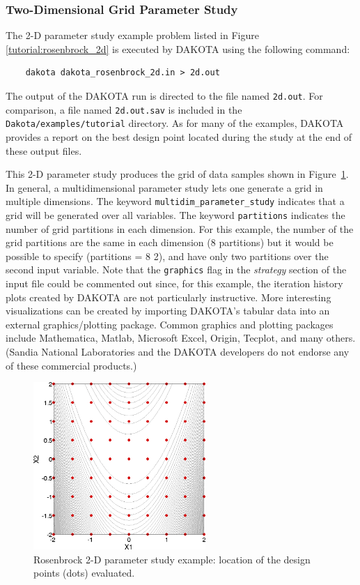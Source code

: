 \subsubsection{Two-Dimensional Grid Parameter Study}\label{tutorial:example:param_study:two}

The 2-D parameter study example problem listed in Figure~
\ref{tutorial:rosenbrock_2d} is executed by DAKOTA using the
following command:
\begin{small}
\begin{verbatim}
    dakota dakota_rosenbrock_2d.in > 2d.out
\end{verbatim}
\end{small}

The output of the DAKOTA run is directed to the file named
\texttt{2d.out}. For comparison, a file named \texttt{2d.out.sav} is
included in the \texttt{Dakota/examples/tutorial} directory. As
for many of the examples, DAKOTA provides a report on the best design
point located during the study at the end of these output files.

This 2-D parameter study produces the grid of data samples shown in
Figure~\ref{tutorial:rosenbrock_2d_graphics}. In general, a multidimensional 
parameter study lets one generate a grid in multiple dimensions. 
The keyword \texttt{multidim\_parameter\_study} indicates that 
a grid will be generated over all variables.  The keyword 
\texttt{partitions} indicates the number of grid partitions in 
each dimension. For this example, the number of the grid partitions 
are the same in each dimension (8 partitions) but it would be possible 
to specify (partitions = 8 2), and have only two partitions 
over the second input variable.   Note that the
\texttt{graphics} flag in the \emph{strategy} section of the input
file could be commented out since, for this example, the iteration
history plots created by DAKOTA are not particularly instructive. More
interesting visualizations can be created by importing DAKOTA's
tabular data into an external graphics/plotting package. Common
graphics and plotting packages include Mathematica, Matlab, Microsoft
Excel, Origin, Tecplot, and many others. (Sandia National Laboratories
and the DAKOTA developers do not endorse any of these commercial
products.)

\begin{figure}[htb!]
  \centering
  \includegraphics[height=2.5in]{images/rosen_2d_pts}
  \caption{Rosenbrock 2-D parameter study example:
  location of the design points (dots) evaluated.}
  \label{tutorial:rosenbrock_2d_graphics}
\end{figure}

